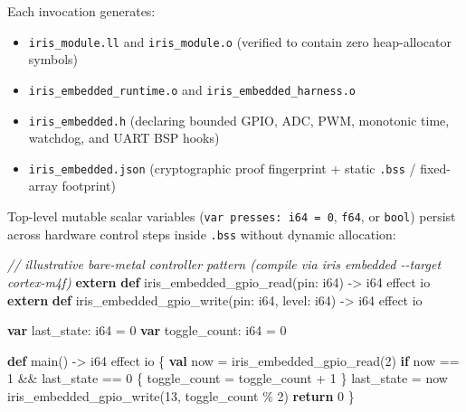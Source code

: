\documentclass[
  english,
  oneside]{book}
\newenvironment{Shaded}{\begin{snugshade}}{\end{snugshade}}
\newcommand{\CommentTok}[1]{\textcolor[rgb]{0.42,0.60,0.33}{\textit{#1}}}
\newcommand{\ControlFlowTok}[1]{\textcolor[rgb]{0.77,0.53,0.75}{\textbf{#1}}}
\newcommand{\DataTypeTok}[1]{\textcolor[rgb]{0.31,0.79,0.69}{#1}}
\newcommand{\DecValTok}[1]{\textcolor[rgb]{0.71,0.81,0.66}{#1}}
\newcommand{\KeywordTok}[1]{\textcolor[rgb]{0.34,0.61,0.84}{\textbf{#1}}}
\newcommand{\NormalTok}[1]{\textcolor[rgb]{0.83,0.83,0.83}{#1}}
\newcommand{\OperatorTok}[1]{\textcolor[rgb]{0.83,0.83,0.83}{#1}}
\providecommand{\tightlist}{%
  \setlength{\itemsep}{0pt}\setlength{\parskip}{0pt}}
\begin{document}
Each invocation generates:

\begin{itemize}
\tightlist
\item
  \texttt{iris\_module.ll} and \texttt{iris\_module.o} (verified to
  contain zero heap-allocator symbols)
\item
  \texttt{iris\_embedded\_runtime.o} and
  \texttt{iris\_embedded\_harness.o}
\item
  \texttt{iris\_embedded.h} (declaring bounded GPIO, ADC, PWM, monotonic
  time, watchdog, and UART BSP hooks)
\item
  \texttt{iris\_embedded.json} (cryptographic proof fingerprint + static
  \texttt{.bss} / fixed-array footprint)
\end{itemize}

Top-level mutable scalar variables (\texttt{var\ presses:\ i64\ =\ 0},
\texttt{f64}, or \texttt{bool}) persist across hardware control steps
inside \texttt{.bss} without dynamic allocation:

\begin{Shaded}
\begin{Highlighting}[]
\CommentTok{// illustrative bare{-}metal controller pattern (compile via \textasciigrave{}iris embedded {-}{-}target cortex{-}m4f\textasciigrave{})}
\KeywordTok{extern} \KeywordTok{def}\NormalTok{ iris\_embedded\_gpio\_read(pin: }\DataTypeTok{i64}\NormalTok{) }\OperatorTok{{-}\textgreater{}} \DataTypeTok{i64}\NormalTok{ effect io}
\KeywordTok{extern} \KeywordTok{def}\NormalTok{ iris\_embedded\_gpio\_write(pin: }\DataTypeTok{i64}\NormalTok{, level: }\DataTypeTok{i64}\NormalTok{) }\OperatorTok{{-}\textgreater{}} \DataTypeTok{i64}\NormalTok{ effect io}

\KeywordTok{var}\NormalTok{ last\_state: }\DataTypeTok{i64} \OperatorTok{=} \DecValTok{0}
\KeywordTok{var}\NormalTok{ toggle\_count: }\DataTypeTok{i64} \OperatorTok{=} \DecValTok{0}

\KeywordTok{def}\NormalTok{ main() }\OperatorTok{{-}\textgreater{}} \DataTypeTok{i64}\NormalTok{ effect io \{}
    \KeywordTok{val}\NormalTok{ now }\OperatorTok{=}\NormalTok{ iris\_embedded\_gpio\_read(}\DecValTok{2}\NormalTok{)}
    \ControlFlowTok{if}\NormalTok{ now }\OperatorTok{==} \DecValTok{1} \OperatorTok{\&\&}\NormalTok{ last\_state }\OperatorTok{==} \DecValTok{0}\NormalTok{ \{}
\NormalTok{        toggle\_count }\OperatorTok{=}\NormalTok{ toggle\_count }\OperatorTok{+} \DecValTok{1}
\NormalTok{    \}}
\NormalTok{    last\_state }\OperatorTok{=}\NormalTok{ now}
\NormalTok{    iris\_embedded\_gpio\_write(}\DecValTok{13}\NormalTok{, toggle\_count }\OperatorTok{\%} \DecValTok{2}\NormalTok{)}
    \ControlFlowTok{return} \DecValTok{0}
\NormalTok{\}}
\end{Highlighting}
\end{Shaded}
\end{document}

